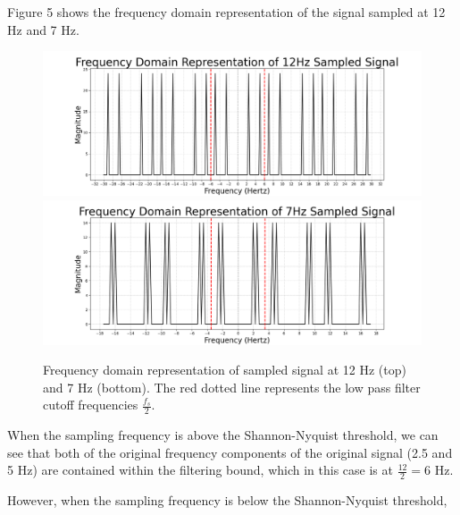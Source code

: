 \documentclass{article}
\begin{document}
Figure 5 shows the frequency domain representation of the signal sampled at 12 Hz and 7 Hz.
\begin{figure}[H]
    \centering
    \begin{minipage}{\textwidth}
        \centering
        \includegraphics[width=\linewidth]{images/new_freqdom_12hz.png}
        \includegraphics[width=\linewidth]{images/new_freqdom_7hz.png}
        \\[0.5em] 
    \end{minipage}
    \caption{Frequency domain representation of sampled signal at 12 Hz (top) and 7 Hz (bottom). The red dotted line represents the low pass filter cutoff frequencies $\frac{f_s}{2}$.}
\end{figure}
When the sampling frequency is above the Shannon-Nyquist threshold, we can see that both of the original frequency components of the original signal (2.5 and 5 Hz) are contained within the filtering bound, which in this case is at $\frac{12}{2}=6$ Hz. 

However, when the sampling frequency is below the Shannon-Nyquist threshold, 

    
\end{document}
